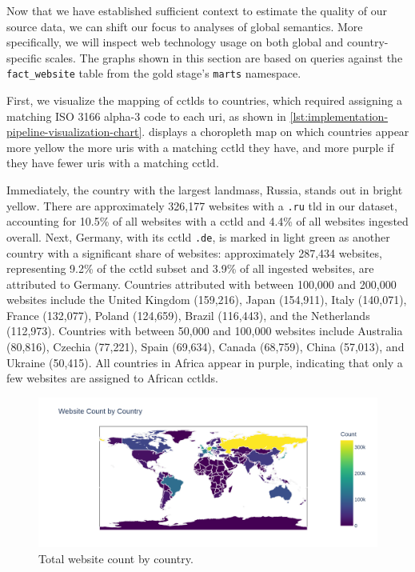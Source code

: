Now that we have established sufficient context to estimate the quality of our source data, we can shift our focus to analyses of global semantics.
More specifically, we will inspect web technology usage on both global and country-specific scales.
The graphs shown in this section are based on queries against the \texttt{fact\_website} table from the gold stage's \texttt{marts} namespace.

First, we visualize the mapping of \acp{cctld} to countries, which required assigning a matching ISO 3166 alpha-3 code to each \ac{uri}, as shown in \cref{lst:implementation-pipeline-visualization-chart}.
 displays a choropleth map on which countries appear more yellow the more \acp{uri} with a matching \ac{cctld} they have, and more purple if they have fewer \acp{uri} with a matching \ac{cctld}.

Immediately, the country with the largest landmass, Russia, stands out in bright yellow.
There are approximately 326,177 websites with a \texttt{.ru} \ac{tld} in our dataset, accounting for 10.5\% of all websites with a \ac{cctld} and 4.4\% of all websites ingested overall.
Next, Germany, with its \ac{cctld} \texttt{.de}, is marked in light green as another country with a significant share of websites: approximately 287,434 websites, representing 9.2\% of the \ac{cctld} subset and 3.9\% of all ingested websites, are attributed to Germany.
Countries attributed with between 100,000 and 200,000 websites include the United Kingdom (159,216), Japan (154,911), Italy (140,071), France (132,077), Poland (124,659), Brazil (116,443), and the Netherlands (112,973).
Countries with between 50,000 and 100,000 websites include Australia (80,816), Czechia (77,221), Spain (69,634), Canada (68,759), China (57,013), and Ukraine (50,415).
All countries in Africa appear in purple, indicating that only a few websites are assigned to African \acp{cctld}.

\begin{figure}[H]
    \centering
    \includegraphics[width=\textwidth]{figures/charts/large/chart_fact_uri_choropleth.png}
    \caption{Total website count by country.}
    \label{fig:analysis-dataset-chart_fact_uri_choropleth}
\end{figure}

